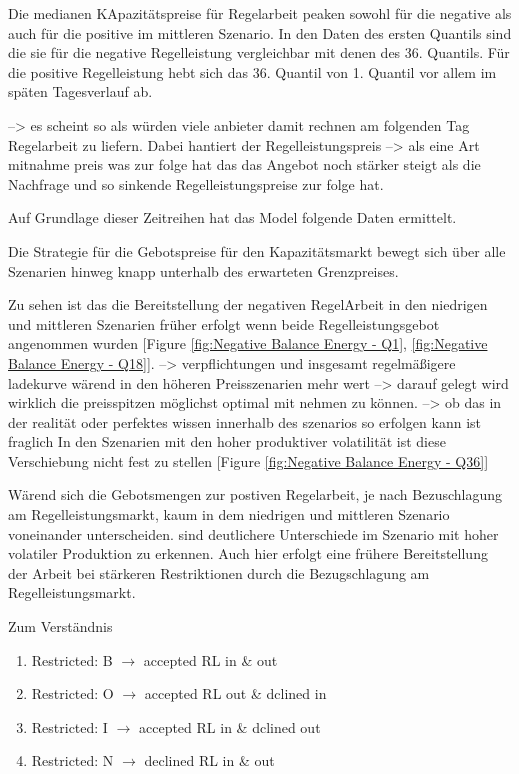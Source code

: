 Die medianen  KApazitätspreise für Regelarbeit peaken
sowohl für die negative als auch für die positive im mittleren Szenario. In den Daten des ersten Quantils sind die sie für die negative Regelleistung
vergleichbar mit denen des 36. Quantils. Für die positive Regelleistung hebt sich das 36. Quantil von 1. Quantil vor allem im späten Tagesverlauf ab.

--> es scheint so als würden viele anbieter damit rechnen am folgenden Tag Regelarbeit zu liefern. Dabei hantiert der Regelleistungspreis
--> als eine Art mitnahme preis was zur folge hat das das Angebot noch stärker steigt als die Nachfrage und so sinkende Regelleistungspreise zur folge hat.

Auf Grundlage dieser Zeitreihen hat das Model folgende Daten ermittelt.

Die Strategie für die Gebotspreise für den Kapazitätsmarkt bewegt sich über alle Szenarien hinweg knapp unterhalb des erwarteten Grenzpreises.

Zu sehen ist das die Bereitstellung der negativen RegelArbeit
in den niedrigen und mittleren Szenarien früher erfolgt wenn beide Regelleistungsgebot angenommen wurden [Figure \ref{fig:Negative Balance Energy - Q1}, \ref{fig:Negative Balance Energy - Q18}].
--> verpflichtungen und insgesamt regelmäßigere ladekurve wärend in den höheren Preisszenarien mehr wert
--> darauf gelegt wird wirklich die preisspitzen möglichst optimal mit nehmen zu können.
--> ob das in der realität oder perfektes wissen innerhalb des szenarios so erfolgen kann ist fraglich
In den Szenarien mit den hoher produktiver volatilität ist diese Verschiebung nicht fest zu stellen [Figure \ref{fig:Negative Balance Energy - Q36}]


Wärend sich die Gebotsmengen zur postiven Regelarbeit, je nach Bezuschlagung am Regelleistungsmarkt,
kaum in dem niedrigen und mittleren Szenario voneinander unterscheiden. sind deutlichere Unterschiede
im Szenario mit hoher volatiler Produktion zu erkennen. Auch hier erfolgt eine frühere Bereitstellung
der Arbeit bei stärkeren Restriktionen durch die Bezugschlagung am Regelleistungsmarkt.



Zum Verständnis
\begin{enumerate}
	\item Restricted: B $\rightarrow$ accepted RL in \& out
	\item Restricted: O $\rightarrow$ accepted RL out \& dclined in
	\item Restricted: I $\rightarrow$ accepted RL in \& dclined out
	\item Restricted: N $\rightarrow$ declined RL in \& out
\end{enumerate}


